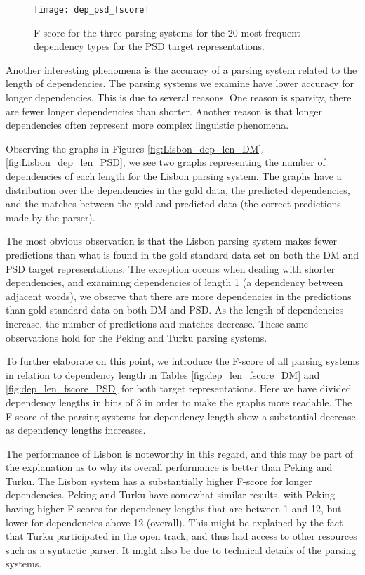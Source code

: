 \begin{figure}[h]
    \centering
    \begin{minipage}{0.8\textwidth}
        \centering
        \texttt{[image: dep\_psd\_fscore]}
    \end{minipage}
    \caption{F-score for the three parsing systems for the 20 most frequent dependency types for the PSD target representations.}
    \label{fig:dep_fscore_PSD}
\end{figure}

Another interesting phenomena is the accuracy of a parsing system related to the length of dependencies. The parsing systems we examine have lower accuracy for longer dependencies. This is due to several reasons. One reason is sparsity, there are fewer longer dependencies than shorter. Another reason is that longer dependencies often represent more complex linguistic phenomena.

Observing the graphs in Figures \ref{fig:Lisbon_dep_len_DM}, \ref{fig:Lisbon_dep_len_PSD}, we see two graphs representing the number of dependencies of each length for the Lisbon parsing system. The graphs have a distribution over the dependencies in the gold data, the predicted dependencies, and the matches between the gold and predicted data (the correct predictions made by the parser).

The most obvious observation is that the Lisbon parsing system makes fewer predictions than what is found in the gold standard data set on both the DM and PSD target representations. The exception occurs when dealing with shorter dependencies, and examining dependencies of length 1 (a dependency between adjacent words), we observe that there are more dependencies in the predictions than gold standard data on both DM and PSD. As the length of dependencies increase, the number of predictions and matches decrease. These same observations hold for the Peking and Turku parsing systems.

To further elaborate on this point, we introduce the F-score of all parsing systems in relation to dependency length in Tables \ref{fig:dep_len_fscore_DM} and \ref{fig:dep_len_fscore_PSD} for both target representations. Here we have divided dependency lengths in bins of 3 in order to make the graphs more readable. The F-score of the parsing systems for dependency length show a substantial decrease as dependency lengths increases.

The performance of Lisbon is noteworthy in this regard, and this may be part of the explanation as to why its overall performance is better than Peking and Turku. The Lisbon system has a substantially higher F-score for longer dependencies. Peking and Turku have somewhat similar results, with Peking having higher F-scores for dependency lengths that are between 1 and 12, but lower for dependencies above 12 (overall). This might be explained by the fact that Turku participated in the open track, and thus had access to other resources such as a syntactic parser. It might also be due to technical details of the parsing systems.


